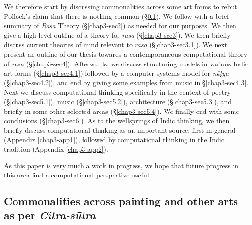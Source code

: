 We therefore start by discussing commonalities across some art forms to rebut Pollock’s claim that there is nothing common (\S\ref{chap3-sec1.3}). We follow with a brief summary of \textsl{Rasa} Theory (\S\ref{chap3-sec2}) as needed for our purposes. We then give a high level outline of a theory for \textsl{rasa} (\S\ref{chap3-sec3}). We then briefly discuss current theories of mind relevant to \textsl{rasa} (\S\ref{chap3-sec3.1}). We next present an outline of our thesis towards a contemporaneous computational theory of \textsl{rasa} (\S\ref{chap3-sec4}). Afterwards, we discuss structuring models in various Indic art forms (\S\ref{chap3-sec4.1}) followed by a computer systems model for \textsl{nāṭya} (\S\ref{chap3-sec4.2}), and end by giving some examples from music in \S\ref{chap3-sec4.3}. Next we discuss computational thinking specifically in the context of poetry (\S\ref{chap3-sec5.1}), music (\S\ref{chap3-sec5.2}), architecture (\S\ref{chap3-sec5.3}), and briefly in some other selected areas (\S\ref{chap3-sec5.4}). We finally end with some conclusions (\S\ref{chap3-sec6}). As to the wellsprings of Indic thinking, we then briefly discuss computational thinking as an important source: first in general (Appendix \ref{chap3-app1}), followed by computational thinking in the Indic tradition (Appendix \ref{chap3-app2}). 

As this paper is very much a work in progress, we hope that future progress in this area find a computational perspective useful.

\subsection{Commonalities across painting and other arts as per \textsl{Citra-sūtra}}\label{chap3-sec1.3}

